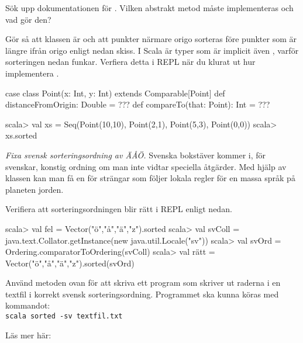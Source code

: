 \Subtask\Pen Sök upp dokumentationen för . Vilken abstrakt metod måste implementeras och vad gör den? 

\Subtask Gör så att klassen  är  och att punkter närmare origo sorteras före punkter som är längre ifrån origo enligt nedan skiss. I Scala är typer som är  implicit även , varför sorteringen nedan funkar. Verfiera detta i REPL när du klurat ut hur implementera . 

\begin{Code}
case class Point(x: Int, y: Int) extends Comparable[Point] {
  def distanceFromOrigin: Double = ???
  def compareTo(that: Point): Int = ???
}
\end{Code}
\begin{REPL}
scala> val xs = Seq(Point(10,10), Point(2,1), Point(5,3), Point(0,0))
scala> xs.sorted
\end{REPL}


\Task \label{task:swedish-letter-ordering} \emph{Fixa svensk sorteringsordning av ÄÅÖ.} Svenska bokstäver kommer i, för svenskar, konstig ordning om man inte vidtar speciella åtgärder. Med hjälp av klassen  kan man få en  för strängar som följer lokala regler för en massa språk på planeten jorden. 

\Subtask Verifiera att sorteringsordningen blir rätt i REPL enligt nedan. 

\begin{REPL}
scala> val fel = Vector("ö","å","ä","z").sorted
scala> val svColl = java.text.Collator.getInstance(new java.util.Locale("sv"))
scala> val svOrd = Ordering.comparatorToOrdering(svColl)
scala> val rätt = Vector("ö","å","ä","z").sorted(svOrd)
\end{REPL}
\Subtask Använd metoden ovan för att skriva ett program som skriver ut raderna i en textfil i korrekt svensk sorteringsordning. Programmet ska kunna köras med kommandot:\\\texttt{scala sorted -sv textfil.txt}

\Subtask Läs mer här: \\



